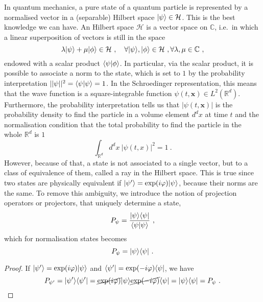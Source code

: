     In quantum mechanics, a pure state of a quantum particle is represented by a normalised vector in a (separable) Hilbert space $\vert\psi\rangle \in \mathcal H$. This is the best knowledge we can have. An Hilbert space $\mathcal H$ is a vector space on $\mathbb C$, i.e.~in which a linear superposition of vectors is still in the space 
    \begin{equation*}
        \lambda \vert\psi\rangle + \mu \vert\phi\rangle \in \mathcal H ~, \quad \forall \vert\psi\rangle, \vert\phi\rangle \in \mathcal H ~, \forall \lambda, \mu \in \mathbb C ~, 
    \end{equation*}
    endowed with a scalar product $\langle\psi\vert\phi\rangle$. In particular, via the scalar product, it is possible to associate a norm to the state, which is set to $1$ by the probability interpretation $||\psi||^2 = \langle\psi\vert\psi\rangle = 1$. In the Schroedinger representation, this means that the wave function is a square-integrable function $\psi(t,\mathbf x) \in L^2(\mathbb R^d)$. Furthermore, the probability interpretation tells us that $|\psi(t, \mathbf x)|$ is the probability density to find the particle in a volume element $d^d x$ at time $t$ and the normalisation condition that the total probability to find the particle in the whole $\mathbb R^d$ is $1$ 
    \begin{equation*}
        \int_{\mathbb R^d} d^d x ~ |\psi(t,x)|^2 = 1 ~.
    \end{equation*}
    However, because of that, a state is not associated to a single vector, but to a class of equivalence of them, called a ray in the Hilbert space. This is true since two states are physically equivalent if $\vert\psi'\rangle = \exp(i \varphi) \vert\psi\rangle$, because their norms are the same. To remove this ambiguity, we introduce the notion of projection operators or projectors, that uniquely determine a state, 
    \begin{equation*}
        P_\psi = \frac{\vert\psi\rangle \langle\psi\vert}{\langle\psi\vert\psi\rangle} ~,
    \end{equation*}
    which for normalisation states becomes 
    \begin{equation}\label{proj}
        P_\psi = \vert\psi\rangle \langle\psi\vert ~.
    \end{equation}
    \begin{proof}
        If $\vert\psi'\rangle = \exp(i \varphi) \vert\psi\rangle$ and $\langle\psi'\vert = \exp(- i \varphi) \langle\psi\vert$, we have 
        \begin{equation*}
            P_{\psi'} = \vert\psi'\rangle \langle\psi'\vert = \cancel{\exp(i \varphi)} \vert\psi\rangle \cancel{\exp(- i \varphi)} \langle\psi\vert = \vert\psi\rangle \langle\psi\vert = P_\psi ~.
        \end{equation*}
    \end{proof}


